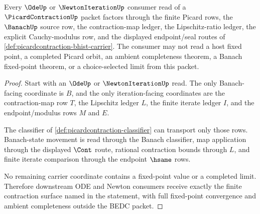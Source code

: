 \begin{theorem}
\label{thm:picardcontraction-banach-ode-boundary}
Every $\OdeUp$ or $\NewtonIterationUp$ consumer read of a
$\PicardContractionUp$ packet factors through the finite Picard rows, the
$\BanachUp$ source row, the contraction-map ledger, the Lipschitz-ratio
ledger, the explicit Cauchy-modulus row, and the displayed endpoint/seal
routes of \autoref{def:picardcontraction-bhist-carrier}. The consumer may not
read a host fixed point, a completed Picard orbit, an ambient completeness
theorem, a Banach fixed-point theorem, or a choice-selected limit from this
packet.
\end{theorem}
\begin{proof}
Start with an $\OdeUp$ or $\NewtonIterationUp$ read. The only Banach-facing
coordinate is $B$, and the only iteration-facing coordinates are the
contraction-map row $T$, the Lipschitz ledger $L$, the finite iterate ledger
$I$, and the endpoint/modulus rows $M$ and $E$.

The classifier of \autoref{def:picardcontraction-classifier} can transport
only those rows. Banach-state movement is read through the Banach classifier,
map application through the displayed $\Cont$ route, rational contraction
bounds through $L$, and finite iterate comparison through the endpoint
$\hsame$ rows.

No remaining carrier coordinate contains a fixed-point value or a completed
limit. Therefore downstream ODE and Newton consumers receive exactly the
finite contraction surface named in the statement, with full fixed-point
convergence and ambient completeness outside the BEDC packet.
\end{proof}

